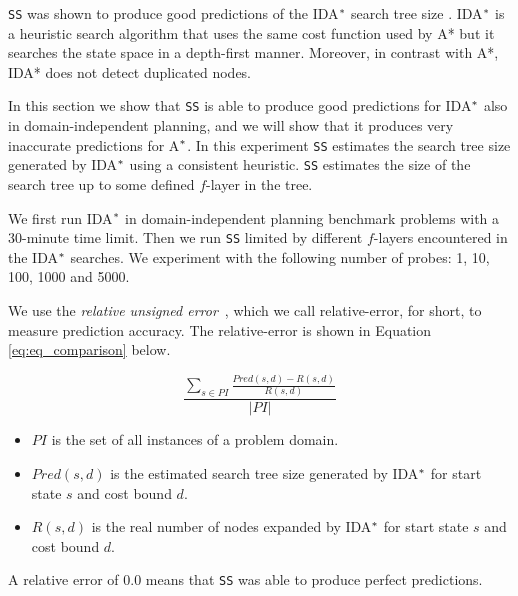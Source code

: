 \noindent
\texttt{SS} was shown to produce good predictions of the IDA$\sp{*}$ search tree size \cite{lelis2013predicting}. IDA$\sp{*}$ is a heuristic search algorithm that uses the same cost function used by A* but it searches the state space in a depth-first manner. Moreover, in contrast with A*, IDA* does not detect duplicated nodes.

 
In this section we show that \texttt{SS} is able to produce good predictions for IDA$\sp{*}$ also in domain-independent planning, and we will show that it produces very inaccurate predictions for A$\sp{*}$. In this experiment \texttt{SS} estimates the search tree size generated by IDA$\sp{*}$ using a consistent heuristic. \texttt{SS} estimates the size of the search tree up to some defined $f$-layer in the tree.

We first run IDA$\sp{*}$ in domain-independent planning benchmark problems with a 30-minute time limit. Then we run \texttt{SS} limited by different $f$-layers encountered in the IDA$\sp{*}$ searches. We experiment with the following number of probes: 1, 10, 100, 1000 and 5000.

We use the \textit{relative unsigned error}~\cite{lelis2012fast}, which we call relative-error, for short, to measure prediction accuracy. The relative-error is shown in Equation \ref{eq:eq_comparison} below.

\begin{equation}
\frac{\sum_{s\in PI} \frac{Pred(s, d) - R(s, d)}{R(s, d)}}{|PI|}
\label{eq:eq_comparison}
\end{equation}

\begin{itemize}
  \item $PI$ is the set of all instances of a problem domain.
  \item $Pred(s,d)$ is the estimated search tree size generated by IDA$\sp{*}$ for start state $s$ and cost bound $d$.
  \item $R(s,d)$ is the real number of nodes expanded by IDA$\sp{*}$ for start state $s$ and cost bound $d$.
\end{itemize}
A relative error of 0.0 means that \texttt{SS} was able to produce perfect predictions.

